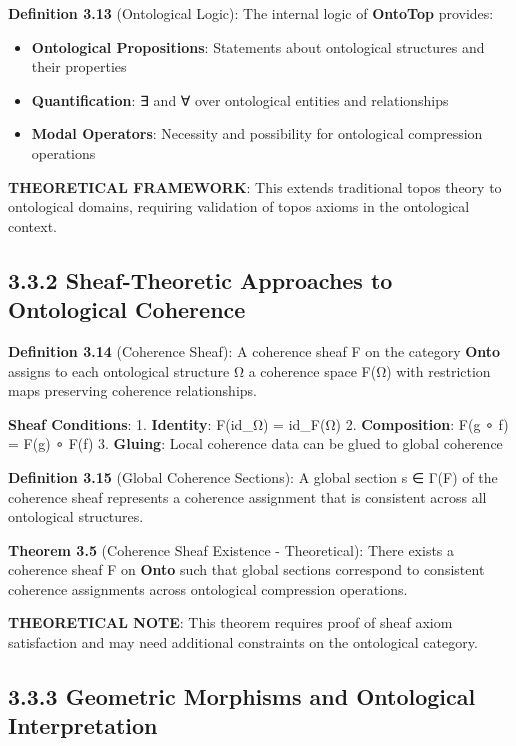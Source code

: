 \textbf{Definition 3.13} (Ontological Logic): The internal logic of \textbf{OntoTop} provides:

\begin{itemize}
\item \textbf{Ontological Propositions}: Statements about ontological structures and their properties
\item \textbf{Quantification}: ∃ and ∀ over ontological entities and relationships
\item \textbf{Modal Operators}: Necessity and possibility for ontological compression operations
\end{itemize}

\textbf{THEORETICAL FRAMEWORK}: This extends traditional topos theory to ontological domains, requiring validation of topos axioms in the ontological context.

\subsection{3.3.2 Sheaf-Theoretic Approaches to Ontological Coherence}

\textbf{Definition 3.14} (Coherence Sheaf): A coherence sheaf F on the category \textbf{Onto} assigns to each ontological structure Ω a coherence space F(Ω) with restriction maps preserving coherence relationships.

\textbf{Sheaf Conditions}:
1. \textbf{Identity}: F(id_Ω) = id_{F(Ω)}
2. \textbf{Composition}: F(g ∘ f) = F(g) ∘ F(f)
3. \textbf{Gluing}: Local coherence data can be glued to global coherence

\textbf{Definition 3.15} (Global Coherence Sections): A global section s ∈ Γ(F) of the coherence sheaf represents a coherence assignment that is consistent across all ontological structures.

\textbf{Theorem 3.5} (Coherence Sheaf Existence - Theoretical): There exists a coherence sheaf F on \textbf{Onto} such that global sections correspond to consistent coherence assignments across ontological compression operations.

\textbf{THEORETICAL NOTE}: This theorem requires proof of sheaf axiom satisfaction and may need additional constraints on the ontological category.

\subsection{3.3.3 Geometric Morphisms and Ontological Interpretation}

